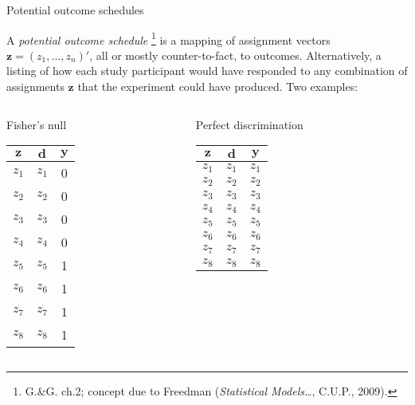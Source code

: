 \begin{frame}{Potential outcome schedules}
  
  A \textit{potential outcome schedule}%
\footnote{G.\&G. ch.2; concept due to Freedman (\textit{Statistical Models\ldots}, C.U.P., 2009).}
is a mapping of assignment vectors $\mathbf{z} = (z_1, \ldots, z_n)'$,
all or mostly counter-to-fact, to outcomes.  Alternatively, a listing of
how each study participant would have responded to
any combination of assignments $\mathbf{z}$ that
the experiment could have produced. Two examples:\\

\begin{columns}
  \begin{Column}
\hspace{1em}    { Fisher's null} \\
    \begin{tabular}{ccc} \hline
 $\mathbf{z}$& $\mathbf{d} $ & $\mathbf{y}$ \\ \hline
$z_1$ &$z_1$ &  0   \\
$z_2$ &$z_2$ &  0   \\
$z_3$ &$z_3$ &  0   \\
$z_4$ &$z_4$ &  0   \\
$z_5$ &$z_5$ &  1   \\
$z_6$ &$z_6$ &  1   \\
$z_7$ &$z_7$ &  1   \\
$z_8$ &$z_8$ &  1   \\ \hline
    \end{tabular}

  \end{Column}
  \begin{Column}
\hspace{1em}   { Perfect discrimination} \\
    \begin{tabular}{ccc} \hline
 $\mathbf{z}$ & $\mathbf{d} $ & $\mathbf{y}$ \\ \hline
$z_1$ &$z_1$ & $z_1$  \\
$z_2$ &$z_2$ & $z_2$  \\
$z_3$ &$z_3$ & $z_3$  \\
$z_4$ &$z_4$ & $z_4$  \\
$z_5$ &$z_5$ & $z_5$  \\
$z_6$ &$z_6$ & $z_6$  \\
$z_7$ &$z_7$ & $z_7$  \\
$z_8$ &$z_8$ & $z_8$  \\ \hline
    \end{tabular}

  \end{Column}

\end{columns}

\end{frame}

